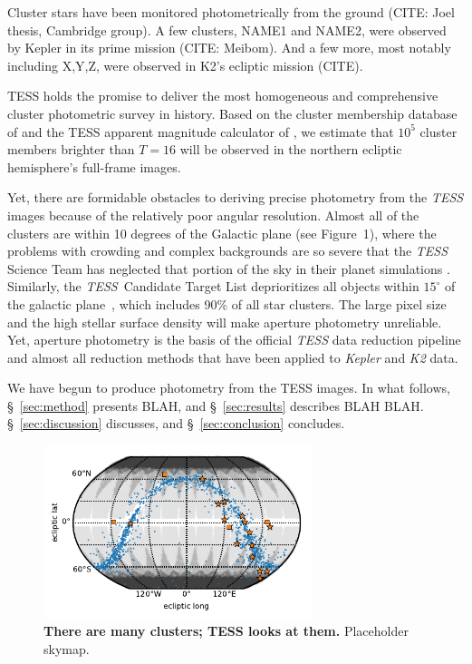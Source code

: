 \documentclass[12pt,twocolumn,tighten]{aastex62}
\begin{document}
Cluster stars have been monitored photometrically from the ground
(CITE: Joel thesis, Cambridge group).
A few clusters, NAME1 and NAME2, were observed by Kepler in its prime
mission (CITE: Meibom).
And a few more, most notably including X,Y,Z, were observed in K2's
ecliptic mission (CITE).

TESS holds the promise to deliver the most homogeneous and
comprehensive cluster photometric survey in history.  Based on the
cluster membership database of \citet{Kharchenko_et_al_2013} and the
TESS apparent magnitude calculator of \citet{Jaffe_Barclay_2017}, we
estimate that $10^5$ cluster members brighter than $T=16$ will be
observed in the northern ecliptic hemisphere's full-frame images.

Yet, there are formidable obstacles to deriving precise photometry
from the {\it TESS} images because of the relatively poor angular
resolution.  Almost all of the clusters are within 10 degrees of the
Galactic plane (see Figure~1), where the problems with crowding and
complex backgrounds are so severe that the {\it TESS}\, Science Team
has neglected that portion of the sky in their planet simulations
\citep{Sullivan_et_al_2015}. Similarly, the {\it TESS}\, Candidate
Target List deprioritizes all objects within $15^\circ$ of the
galactic plane~\citep{stassun_TIC_2018}, which includes 90\% of all
star clusters.  The large pixel size and the high stellar surface
density will make aperture photometry unreliable.  Yet, aperture
photometry is the basis of the official {\it TESS} data reduction
pipeline and almost all reduction methods that have been applied to
{\it Kepler} and {\it K2} data.


We have begun to produce photometry from the TESS images.
In what follows, \S~\ref{sec:method} presents BLAH, and
\S~\ref{sec:results} describes BLAH BLAH.
\S~\ref{sec:discussion} discusses, and \S~\ref{sec:conclusion}
concludes.


\begin{figure}[t]
	\begin{center}
		\leavevmode
		\includegraphics[width=0.7\textwidth]{f1_PLACEHOLDER.pdf}
	\end{center}
	\vspace{-0.5cm}
	\caption{
    {\bf There are many clusters; TESS looks at them.} Placeholder skymap.
		\label{fig:clustermap}
	}
\end{figure}
\end{document}

